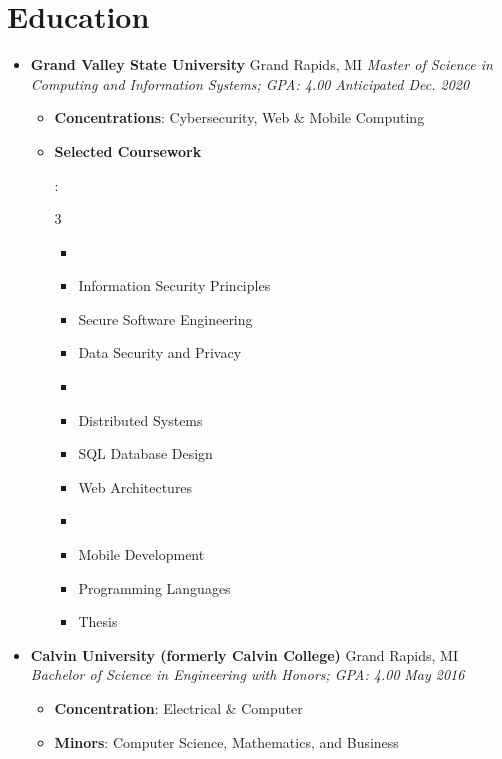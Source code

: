 \documentclass[letterpaper,11pt]{article}
\newcommand{\resumeItem}[2]{
  \item\small{
    \textbf{#1}{: #2 \vspace{-2pt}}
  }
}
\newcommand{\resumeSubheading}[4]{
  \vspace{-1pt}\item
    \textbf{#1} \dotfill #2 \newline
    \textit{\small#3} \hfill \textit{\small #4}
  \vspace{-5pt}
}
\newcommand{\resumeSubHeadingListStart}{\begin{itemize}[leftmargin=*]}
\newcommand{\resumeSubHeadingListEnd}{\end{itemize}}
\newcommand{\resumeItemListStart}{\begin{itemize}}
\newcommand{\resumeItemListEnd}{\end{itemize}\vspace{-5pt}}
\newcommand{\resumeListMulticolStart}[1]{
  \vspace{-2.4em}
  \setlength{\columnsep}{-1pc}
  \begin{multicols}{#1}
    \begin{itemize}[label={}]
      \item
}
\newcommand{\resumeListMulticolEnd}{
    \end{itemize}
  \end{multicols}
  \vspace{-10pt}
}
\begin{document}
\section{Education}
  \resumeSubHeadingListStart
    \resumeSubheading
      {Grand Valley State University}{Grand Rapids, MI}
      {Master of Science in Computing and Information Systems; GPA: 4.00}{Anticipated Dec. 2020}
      \resumeItemListStart
        \resumeItem{Concentrations}
          {Cybersecurity, Web \& Mobile Computing}
        \resumeItem{Selected Coursework}
          {
            \resumeListMulticolStart{3}
              \item Information Security Principles
              \item Secure Software Engineering
              \item Data Security and Privacy
              \item %
              \item Distributed Systems
              \item SQL Database Design
              \item Web Architectures
              \item %
              \item Mobile Development
              \item Programming Languages
              \item Thesis
            \resumeListMulticolEnd
          }
      \resumeItemListEnd
    \resumeSubheading
      {Calvin University (formerly Calvin College)}{Grand Rapids, MI}
      {Bachelor of Science in Engineering with Honors; GPA: 4.00}{May 2016}
      \resumeItemListStart
        \resumeItem{Concentration}
          {Electrical \& Computer}
        \resumeItem{Minors}
          {Computer Science, Mathematics, and Business}
      \resumeItemListEnd
  \resumeSubHeadingListEnd
\end{document}
